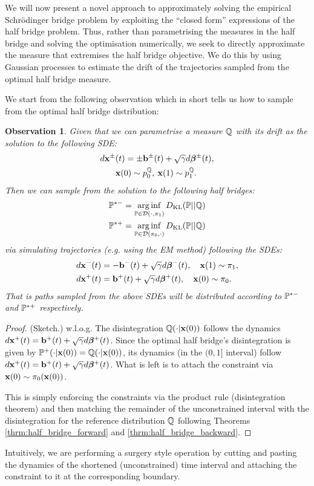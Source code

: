 \documentclass[a4paper,12pt,twoside,openright]{report}
\newtheorem{observation}{Observation}
\theoremstyle{definition}
\begin{document}
We will now present a novel approach to approximately solving the empirical Schrödinger bridge problem by exploiting the ``closed form'' expressions of the half bridge problem.  Thus, rather than parametrising the measures in the half bridge and solving the optimisation numerically, we seek to directly approximate the measure that extremises the half bridge objective. We do this by using Gaussian processes \citep{williams2006gaussian} to estimate the drift of the trajectories sampled from the optimal half bridge measure.

We start from the following observation which in short tells us how to sample from the optimal half bridge distribution:
\begin{observation}
Given that we can parametrise a measure $\Q$ with its drift as the solution to the following SDE:
\begin{align*}
    d\rvx^{\pm}&(t) =  \pm \rvb^{\pm}(t) + \sqrt{\gamma} d \rvw^{\pm}(t) ,\\
 &\rvx(0) \sim p_0^\Q,\:\rvx(1) \sim p_1^\Q.
\end{align*}
Then we can sample from the solution to the following half bridges:
\begin{align*}
   \P^{*-} = \arginf_{\P \in \calD(\cdot,\pi_1)}\KL(\P || \Q) \\ 
   \P^{*+} = \arginf_{\P \in \calD(\pi_0,\cdot )}\KL(\P || \Q)
\end{align*}
via simulating trajectories (e.g. using the EM method) following the SDEs:
\begin{align*}
     d\rvx^{-}(t) &=  - \rvb^{-}(t) + \sqrt{\gamma} d \rvw^{-}(t) , \quad  \rvx(1) \sim \pi_1, \\
     d\rvx^{+}(t) &=  \rvb^{+}(t) + \sqrt{\gamma} d \rvw^{+}(t) , \quad  \rvx(0) \sim \pi_0.
\end{align*}
That is paths sampled from the above SDEs will be distributed according to $\P^{*-}$ and $\P^{*+}$ respectively.
\end{observation}
\begin{proof}(Sketch.)
w.l.o.g. The disintegration $\Q( \cdot| \rvx(0) )$ follows the dynamics $d\rvx^{+}(t) =  \rvb^{+}(t) + \sqrt{\gamma} d \rvw^{+}(t)$. Since the optimal half bridge's disintegration is given by $\P^+( \cdot| \rvx(0) ) =\Q( \cdot| \rvx(0) )$, its dynamics (in the $(0,1]$ interval) follow  $d\rvx^{+}(t) =  \rvb^{+}(t) + \sqrt{\gamma} d \rvw^{+}(t)$. What is left is to attach the constraint via $\rvx(0) \sim \pi_0(\rvx(0))$. 

This is simply enforcing the constraints via the product rule (disintegration theorem) and then matching the remainder of the unconstrained interval with the disintegration for the reference distribution $\Q$ following Theorems \ref{thrm:half_bridge_forward} and \ref{thrm:half_bridge_backward}.
\end{proof}
Intuitively, we are performing a surgery style operation by cutting and pasting the dynamics of the shortened (unconstrained) time interval and attaching the constraint to it at the corresponding boundary.
\end{document}
